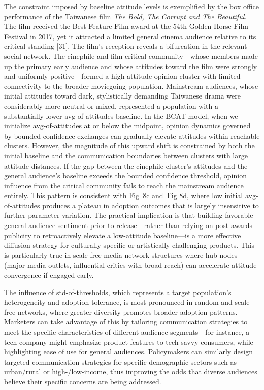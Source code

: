 \documentclass[10pt,letterpaper]{article}
\begin{document}
The constraint imposed by baseline attitude levels is exemplified by the box office performance of the Taiwanese film \textit{The Bold, The Corrupt and The Beautiful}. The film received the Best Feature Film award at the 54th Golden Horse Film Festival in 2017, yet it attracted a limited general cinema audience relative to its critical standing [31]. The film's reception reveals a bifurcation in the relevant social network. The cinephile and film-critical community---whose members made up the primary early audience and whose attitudes toward the film were strongly and uniformly positive---formed a high-attitude opinion cluster with limited connectivity to the broader moviegoing population. Mainstream audiences, whose initial attitudes toward dark, stylistically demanding Taiwanese drama were considerably more neutral or mixed, represented a population with a substantially lower avg-of-attitudes baseline. In the BCAT model, when we initialize avg-of-attitudes at or below the midpoint, opinion dynamics governed by bounded confidence exchanges can gradually elevate attitudes within reachable clusters. However, the magnitude of this upward shift is constrained by both the initial baseline and the communication boundaries between clusters with large attitude distances. If the gap between the cinephile cluster's attitudes and the general audience's baseline exceeds the bounded confidence threshold, opinion influence from the critical community fails to reach the mainstream audience entirely. This pattern is consistent with Fig~8c and~Fig 8d, where low initial avg-of-attitudes produces a plateau in adoption outcomes that is largely insensitive to further parameter variation. The practical implication is that building favorable general audience sentiment prior to release---rather than relying on post-awards publicity to retroactively elevate a low-attitude baseline---is a more effective diffusion strategy for culturally specific or artistically challenging products. This is particularly true in scale-free media network structures where hub nodes (major media outlets, influential critics with broad reach) can accelerate attitude convergence if engaged early.

The influence of std-of-thresholds, which represents a target population's heterogeneity and adoption tolerance, is most pronounced in random and scale-free networks, where greater diversity promotes broader adoption patterns. Marketers can take advantage of this by tailoring communication strategies to meet the specific characteristics of different audience segments---for instance, a tech company might emphasize product features to tech-savvy consumers, while highlighting ease of use for general audiences. Policymakers can similarly design targeted communication strategies for specific demographic sectors such as urban/rural or high-/low-income, thus improving the odds that diverse audiences believe their specific concerns are being addressed.
\end{document}
